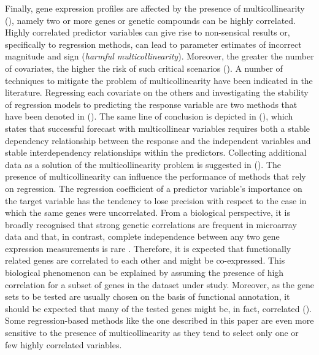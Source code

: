 Finally, gene expression profiles are affected by the presence of multicollinearity (\citealp{est_multicoll, ml_multicoll}), namely two or more genes or genetic compounds can be highly correlated. Highly correlated predictor variables can give rise to non-sensical results or, specifically to regression methods, can lead to parameter estimates of incorrect magnitude and sign (\emph{harmful multicollinearity}). Moreover, the greater the number of covariates, the higher the risk of such critical scenarios (\citealp{multicollinearity_kvs}).  
A number of techniques to mitigate the problem of multicollinearity have been indicated in the literature. Regressing each covariate on the others and investigating the stability of regression models to predicting the response variable are two methods that have been denoted in (\citealp{multicollinearity_kvs}). The same line of conclusion is depicted in (\citealp{farrar1964multicollinearity}), which states that successful forecast with multicollinear variables requires both a stable dependency relationship between the response and the independent variables and stable interdependency relationships within the predictors. Collecting additional data as a solution of the multicollinearity problem is suggested in (\citealp{multicollinearity_kvs, farrar1964multicollinearity}).
The presence of multicollinearity can influence the performance of methods that rely on regression. The regression coefficient of a predictor variable's importance on the target variable has the tendency to lose precision with respect to the case in which the same genes were uncorrelated. 
From a biological perspective, it is broadly recognised that strong genetic correlations are frequent in microarray data and that, in contrast, complete independence between any two gene expression measurements is rare \citealp{Goeman2007}. Therefore, it is expected that functionally related genes are correlated to each other and might be co-expressed. This biological phenomenon can be explained by assuming the presence of high correlation for a subset of genes in the dataset under study. Moreover, as the gene sets to be tested are usually chosen on the basis of functional annotation, it should be expected that many of the tested genes might be, in fact, correlated (\citealp{genesets}).
Some regression-based methods like the one described in this paper are even more sensitive to the presence of multicollinearity as they tend to select only one or few highly correlated variables.

